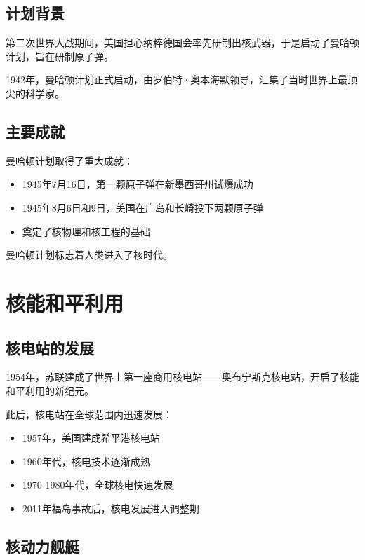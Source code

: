 \documentclass[12pt,UTF8]{ctexbook}
\begin{document}
\section{计划背景}

第二次世界大战期间，美国担心纳粹德国会率先研制出核武器，于是启动了曼哈顿计划，旨在研制原子弹。

1942年，曼哈顿计划正式启动，由罗伯特·奥本海默领导，汇集了当时世界上最顶尖的科学家。

\section{主要成就}

曼哈顿计划取得了重大成就：

\begin{itemize}[leftmargin=2cm]
    \item 1945年7月16日，第一颗原子弹在新墨西哥州试爆成功
    \item 1945年8月6日和9日，美国在广岛和长崎投下两颗原子弹
    \item 奠定了核物理和核工程的基础
\end{itemize}

曼哈顿计划标志着人类进入了核时代。

\chapter{核能和平利用}

\section{核电站的发展}

1954年，苏联建成了世界上第一座商用核电站——奥布宁斯克核电站，开启了核能和平利用的新纪元。

此后，核电站在全球范围内迅速发展：

\begin{itemize}[leftmargin=2cm]
    \item 1957年，美国建成希平港核电站
    \item 1960年代，核电技术逐渐成熟
    \item 1970-1980年代，全球核电快速发展
    \item 2011年福岛事故后，核电发展进入调整期
\end{itemize}

\section{核动力舰艇}
\end{document}
